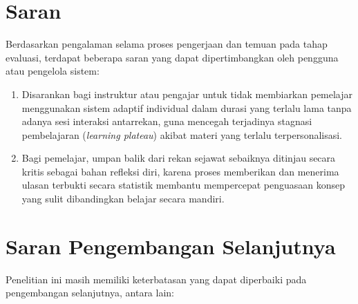 \section{Saran}
\label{sec:saran}

Berdasarkan pengalaman selama proses pengerjaan dan temuan pada tahap evaluasi, terdapat beberapa saran yang dapat dipertimbangkan oleh pengguna atau pengelola sistem:

\begin{enumerate}
    \item Disarankan bagi instruktur atau pengajar untuk tidak membiarkan pemelajar menggunakan sistem adaptif individual dalam durasi yang terlalu lama tanpa adanya sesi interaksi antarrekan, guna mencegah terjadinya stagnasi pembelajaran (\textit{learning plateau}) akibat materi yang terlalu terpersonalisasi.
    \item Bagi pemelajar, umpan balik dari rekan sejawat sebaiknya ditinjau secara kritis sebagai bahan refleksi diri, karena proses memberikan dan menerima ulasan terbukti secara statistik membantu mempercepat penguasaan konsep yang sulit dibandingkan belajar secara mandiri.
\end{enumerate}

\section{Saran Pengembangan Selanjutnya}
\label{sec:future_works}

Penelitian ini masih memiliki keterbatasan yang dapat diperbaiki pada pengembangan selanjutnya, antara lain:

